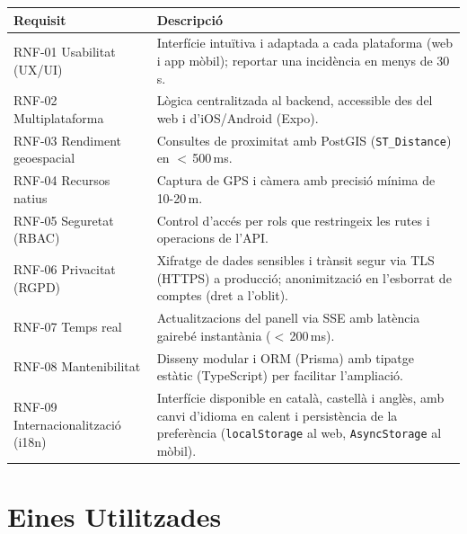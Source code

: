 \documentclass[10pt,a4paper,twocolumn,twoside]{article}
\begin{document}
		\begin{table}[H]
			\centering
			\footnotesize
			\begin{tabular}{|p{}|p{}|}
				\hline
				\textbf{Requisit} & \textbf{Descripció} \\
				\hline
				RNF-01 \newline Usabilitat (UX/UI) & Interfície intuïtiva i adaptada a cada plataforma (web i app mòbil); reportar una incidència en menys de 30\,s. \\
				\hline
				RNF-02 \newline Multiplataforma & Lògica centralitzada al backend, accessible des del web i d'iOS/Android (Expo). \\
				\hline
				RNF-03 \newline Rendiment geoespacial & Consultes de proximitat amb PostGIS (\texttt{ST\_Distance}) en $<$\,500\,ms. \\
				\hline
				RNF-04 \newline Recursos natius & Captura de GPS i càmera amb precisió mínima de 10-20\,m. \\
				\hline
				RNF-05 \newline Seguretat (RBAC) & Control d'accés per rols que restringeix les rutes i operacions de l'API. \\
				\hline
				RNF-06 \newline Privacitat (RGPD)\cite{5} & Xifratge de dades sensibles i trànsit segur via TLS (HTTPS) a producció; anonimització en l'esborrat de comptes (dret a l'oblit). \\
				\hline
				RNF-07 \newline Temps real & Actualitzacions del panell via SSE amb latència gairebé instantània ($<$\,200\,ms). \\
				\hline
				RNF-08 \newline Mantenibilitat & Disseny modular i ORM (Prisma) amb tipatge estàtic (TypeScript) per facilitar l'ampliació. \\
				\hline
				RNF-09 \newline Internacionalització (i18n) & Interfície disponible en català, castellà i anglès, amb canvi d'idioma en calent i persistència de la preferència (\texttt{localStorage} al web, \texttt{AsyncStorage} al mòbil). \\
				\hline
			\end{tabular}
		\end{table}
		
		
		\section{Eines Utilitzades}
		
\end{document}
